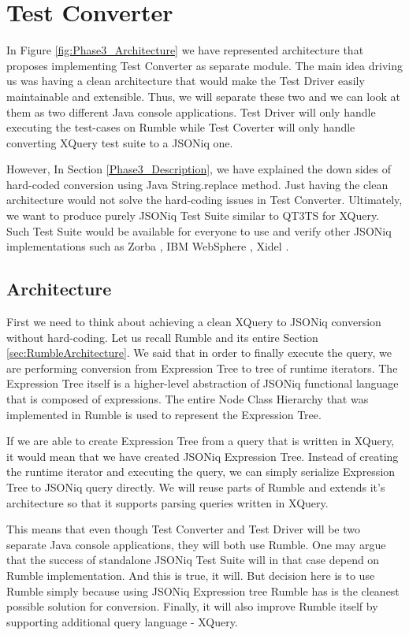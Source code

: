
\chapter{Test Converter}
In Figure \ref{fig:Phase3_Architecture} we have represented architecture that proposes implementing Test Converter as separate module. The main idea driving us was having a clean architecture that would make the Test Driver easily maintainable and extensible. Thus, we will separate these two and we can look at them as two different Java console applications. Test Driver will only handle executing the test-cases on Rumble while Test Coverter will only handle converting XQuery test suite to a JSONiq one. 

However, In Section \ref{Phase3_Description}, we have explained the down sides of hard-coded conversion using Java String.replace method. Just having the clean architecture would not solve the hard-coding issues in Test Converter. Ultimately, we want to produce purely JSONiq Test Suite similar to QT3TS for XQuery. Such Test Suite would be available for everyone to use and verify other JSONiq implementations such as Zorba \cite{Zorba}, IBM WebSphere \cite{WebSphere}, Xidel \cite{Xidel}.

\section{Architecture}
First we need to think about achieving a clean XQuery to JSONiq conversion without hard-coding. Let us recall Rumble and its entire Section \ref{sec:RumbleArchitecture}. We said that in order to finally execute the query, we are performing conversion from Expression Tree to tree of runtime iterators. The Expression Tree itself is a higher-level abstraction of JSONiq functional language that is composed of expressions. The entire Node Class Hierarchy that was implemented in Rumble is used to represent the Expression Tree.

If we are able to create Expression Tree from a query that is written in XQuery, it would mean that we have created JSONiq Expression Tree. Instead of creating the runtime iterator and executing the query, we can simply serialize Expression Tree to JSONiq query directly. We will reuse parts of Rumble and extends it's architecture so that it supports parsing queries written in XQuery. 

This means that even though Test Converter and Test Driver will be two separate Java console applications, they will both use Rumble. One may argue that the success of standalone JSONiq Test Suite will in that case depend on Rumble implementation. And this is true, it will. But decision here is to use Rumble simply because using JSONiq Expression tree Rumble has is the cleanest possible solution for conversion. Finally, it will also improve Rumble itself by supporting additional query language - XQuery.

